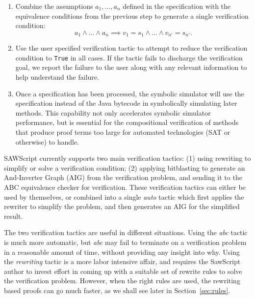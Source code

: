 \documentclass[12pt]{galois-whitepaper}
\newcommand{\sawScript}{{\sc SawScript}\xspace}
\begin{document}
\begin{enumerate}
\begin{itemize}
 \end{itemize}

 \item Combine the assumptions $a_1, \dots, a_n$ defined in the specification
         with the equivalence conditions from the previous step to generate a single
         verification condition:
       \[ a_1 \wedge \dots \wedge a_n \implies
         v_1 = s_1 \wedge \dots \wedge v_{n'} = s_{n'}.\]

 \item Use the user specified verification tactic to attempt to reduce the verification
         condition to {\tt True} in all cases.  If the tactic fails to discharge the
         verification goal, we report the failure to the user along with any
         relevant information to help understand the failure.
         
 \item Once a specification has been processed, the symbolic simulator will
         use the specification instead of the Java bytecode in symbolically
         simulating later methods.  This capability not only accelerates symbolic
         simulator performance, but is essential for the compositional
         verification of methods that produce proof terms too large for automated
         technologies (SAT or otherwise) to handle.
           
\end{enumerate}

SAWScript currently supports two main verification tactics: (1) using rewriting
to simplify or solve a verification condition; (2) applying bitblasting to
generate an And-Inverter Graph (AIG) from the verification problem, and sending
it to the ABC equivalence checker for verification.  These verification
tactics can either be used by themselves, or combined into a single \emph{auto}
tactic which first applies the rewriter to simplify the problem, and then
generates an AIG for the simplified result.

The two verification tactics are useful in different situations.  Using the
\emph{abc} tactic is much more automatic, but \emph{abc} may fail to terminate
on a verification problem in a reasonable amount of time, 
without providing any insight into why.  Using the
\emph{rewriting} tactic is a more labor intensive affair, and requires the
\sawScript author to invest effort in coming up with a suitable set of rewrite rules
to solve the verification problem. However, when the right rules are used, the
rewriting based proofs can go much faster, as we shall see later in Section~\ref{sec:rules}.
\end{document}
